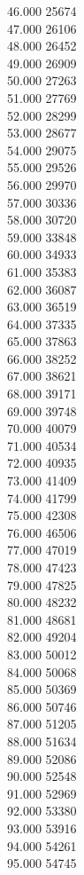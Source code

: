 { 46.000	25674 \\
 47.000	26106 \\
 48.000	26452 \\
 49.000	26909 \\
 50.000	27263 \\
 51.000	27769 \\
 52.000	28299 \\
 53.000	28677 \\
 54.000	29075 \\
 55.000	29526 \\
 56.000	29970 \\
 57.000	30336 \\
 58.000	30720 \\
 59.000	33848 \\
 60.000	34933 \\
 61.000	35383 \\
 62.000	36087 \\
 63.000	36519 \\
 64.000	37335 \\
 65.000	37863 \\
 66.000	38252 \\
 67.000	38621 \\
 68.000	39171 \\
 69.000	39748 \\
 70.000	40079 \\
 71.000	40534 \\
 72.000	40935 \\
 73.000	41409 \\
 74.000	41799 \\
 75.000	42308 \\
 76.000	46506 \\
 77.000	47019 \\
 78.000	47423 \\
 79.000	47825 \\
 80.000	48232 \\
 81.000	48681 \\
 82.000	49204 \\
 83.000	50012 \\
 84.000	50068 \\
 85.000	50369 \\
 86.000	50746 \\
 87.000	51205 \\
 88.000	51634 \\
 89.000	52086 \\
 90.000	52548 \\
 91.000	52969 \\
 92.000	53380 \\
 93.000	53916 \\
 94.000	54261 \\
 95.000	54745 \\
}
